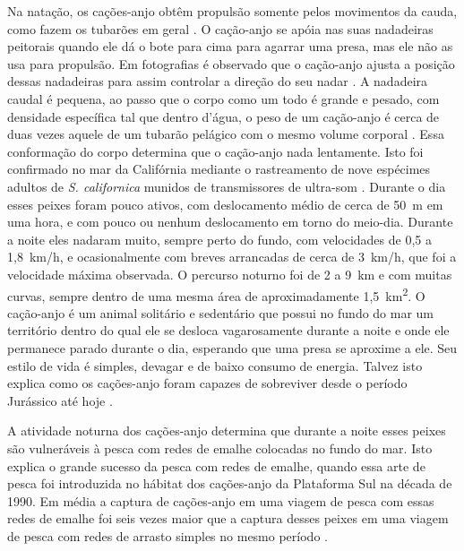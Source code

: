 \documentclass[a4paper,11pt,twoside,showtrims,onecolumn,openright,final]{memoir}
\begin{document}
Na natação, os cações-anjo obtêm propulsão somente pelos movimentos da cauda, 
como fazem os tubarões em geral \citep{bigelow1948}. %
O cação-anjo se apóia nas suas nadadeiras peitorais quando ele dá o bote para 
cima para agarrar uma presa, mas ele não as usa  para propulsão.  Em fotografias é observado 
que o cação-anjo ajusta a posição dessas nadadeiras para 
assim controlar a direção do seu nadar \citep{server1989}. %
A nadadeira caudal é pequena, ao passo que o corpo como um todo é grande e pesado, 
com densidade específica tal que dentro d'água, o peso de um cação-anjo é cerca de 
duas vezes aquele de um tubarão pelágico com o mesmo volume corporal \citep{stevens1987}. %
Essa conformação do corpo determina que o cação-anjo nada lentamente. 
Isto foi confirmado no mar da Califórnia mediante o rastreamento de nove espécimes 
adultos de \emph{S. californica}  munidos de transmissores de ultra-som \citep{standora1977}. %
Durante o dia esses peixes foram pouco ativos, com deslocamento médio de cerca de 50~m em uma hora, 
e com pouco ou nenhum deslocamento em torno do meio-dia. Durante a noite eles nadaram muito, 
sempre perto do fundo, com velocidades de 0,5 a 1,8~km/h, e ocasionalmente com breves 
arrancadas de cerca de 3~km/h, que foi a velocidade máxima observada. 
O percurso noturno foi de 2 a 9~km e com muitas curvas, sempre dentro de uma mesma área 
de aproximadamente 1,5~km\textsuperscript{2}. O cação-anjo é um animal solitário e sedentário que possui 
no fundo do mar um território dentro do qual ele se desloca vagarosamente durante a noite 
e onde ele  permanece parado durante o dia, esperando que uma presa se aproxime a ele. 
Seu estilo de vida é simples, devagar e de baixo consumo de energia. Talvez isto explica 
como os cações-anjo foram capazes de sobreviver desde 
o período Jurássico até hoje \citep{cappetta1987}. %

A atividade noturna dos cações-anjo determina que durante a noite esses peixes são 
vulneráveis à pesca com redes de emalhe colocadas no fundo do mar. Isto explica o 
grande sucesso da pesca com redes de emalhe, quando essa arte de pesca foi introduzida 
no hábitat dos cações-anjo da Plataforma Sul na década de 1990. Em média a captura de 
cações-anjo em uma viagem de pesca com essas redes de emalhe foi seis vezes maior que 
a captura desses peixes em uma viagem de pesca com redes de arrasto simples 
no mesmo período \citep{miranda2003}. %
\end{document}
